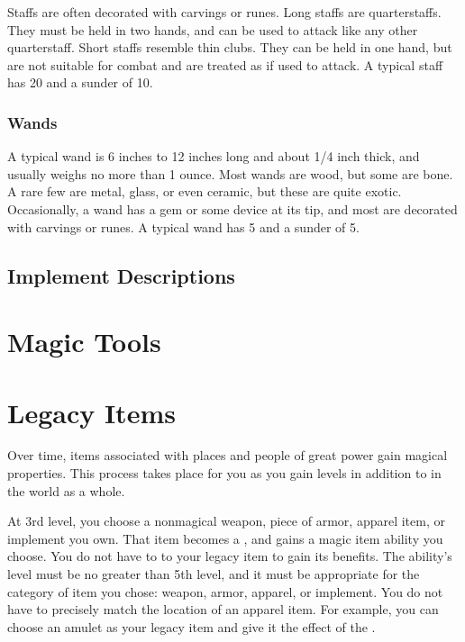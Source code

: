             Staffs are often decorated with carvings or runes.
            Long staffs are quarterstaffs.
            They must be held in two hands, and can be used to attack like any other quarterstaff.
            Short staffs resemble thin clubs.
            They can be held in one hand, but are not suitable for combat and are treated as  if used to attack.
            A typical staff has 20  and a sunder  of 10.

        \subsubsection{Wands}

             A typical wand is 6 inches to 12 inches long and about 1/4 inch thick, and usually weighs no more than 1 ounce.
            Most wands are wood, but some are bone.
            A rare few are metal, glass, or even ceramic, but these are quite exotic.
            Occasionally, a wand has a gem or some device at its tip, and most are decorated with carvings or runes.
            A typical wand has 5  and a sunder  of 5.

    \subsection{Implement Descriptions}

        

        

\section{Magic Tools}

    

    

\section{Legacy Items}\label{Legacy Items}

    Over time, items associated with places and people of great power gain magical properties.
    This process takes place for you as you gain levels in addition to in the world as a whole.

    At 3rd level, you choose a nonmagical weapon, piece of armor, apparel item, or implement you own.
    That item becomes a , and gains a magic item ability you choose.
    You do not have to  to your legacy item to gain its benefits.
    The ability's level must be no greater than 5th level, and it must be appropriate for the category of item you chose: weapon, armor, apparel, or implement.
    You do not have to precisely match the location of an apparel item.
    For example, you can choose an amulet as your legacy item and give it the effect of the .

